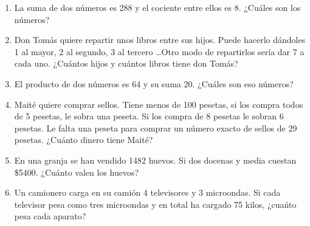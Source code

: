 \documentclass[10pt,twoside]{article}
\begin{document}
\begin{enumerate}
\begin{enumerate}
\begin{multicols}{2}
\end{multicols}
\end{enumerate}
\item La suma de dos números es 288 y el cociente entre ellos es 8. ¿Cuáles son los números?
\item Don Tomás quiere repartir unos libros entre sus hijos. Puede hacerlo dándoles 1 al mayor, 2 al segundo, 3 al tercero \ldots Otro modo de repartirlos sería dar 7 a cada uno. ¿Cuántos hijos y cuántos libros tiene don Tomás?
\item El producto de dos números es 64 y su suma 20. ¿Cuáles son eso números?
\item Maité quiere comprar sellos. Tiene menos de 100 pesetas, si los compra todos de 5 pesetas, le sobra una peseta. Si los compra de 8 pesetas le sobran 6 pesetas. Le falta una peseta para comprar un n\'{u}mero exacto de sellos de 29 pesetas. ¿Cu\'{a}nto dinero tiene Mait\'{e}?
\item En una granja se han vendido 1482 huevos. Si dos docenas y media cuestan \$5400. ¿Cuánto valen los huevos?
\item Un camionero carga en su camión 4 televisores y 3 microondas. Si cada televisor pesa como tres microondas y en total ha cargado 75 kilos, ¿cuańto pesa cada aparato?

\end{enumerate}
\end{document}

